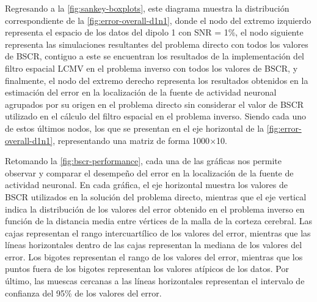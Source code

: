 Regresando a la \cref{fig:sankey-boxplots}, este diagrama muestra la distribución correspondiente de la \cref{fig:error-overall-d1n1}, donde el nodo del extremo izquierdo representa el espacio de los datos del dipolo 1 con SNR = 1\%, el nodo siguiente representa las simulaciones resultantes del problema directo con todos los valores de BSCR, contiguo a este se encuentran los resultados de la implementación del filtro espacial LCMV en el problema inverso con todos los valores de BSCR, y finalmente, el nodo del extremo derecho representa los resultados obtenidos en la estimación del error en la localización de la fuente de actividad neuronal agrupados por su origen en el problema directo sin considerar el valor de BSCR utilizado en el cálculo del filtro espacial en el problema inverso.
Siendo cada uno de estos últimos nodos, los que se presentan en el eje horizontal de la \cref{fig:error-overall-d1n1}, representando una matriz de forma 1000$\times$10. 

Retomando la \cref{fig:bscr-performance}, cada una de las gráficas nos permite observar y comparar el desempeño del error en la localización de la fuente de actividad neuronal.
En cada gráfica, el eje horizontal muestra los valores de BSCR utilizados en la solución del problema directo, mientras que el eje vertical indica la distribución de los valores del error obtenido en el problema inverso en función de la distancia media entre vértices de la malla de la corteza cerebral.
Las cajas representan el rango intercuartílico de los valores del error, mientras que las líneas horizontales dentro de las cajas representan la mediana de los valores del error.
Los bigotes representan el rango de los valores del error, mientras que los puntos fuera de los bigotes representan los valores atípicos de los datos.
Por último, las muescas cercanas a las líneas horizontales representan el intervalo de confianza del 95\% de los valores del error.



